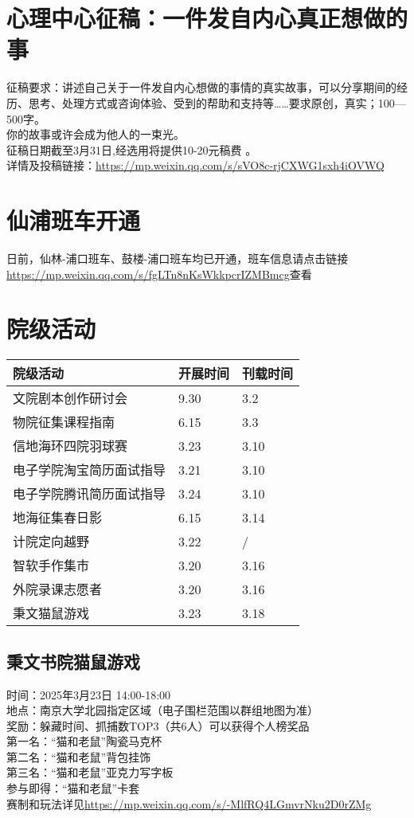\documentclass[letterpaper, 12pt]{article}
\begin{document}
\begin{multicols}{2}
\section{心理中心征稿：一件发自内心真正想做的事}
征稿要求：讲述自己关于一件发自内心想做的事情的真实故事，可以分享期间的经历、思考、处理方式或咨询体验、受到的帮助和支持等……要求原创，真实；100—500字。\\
你的故事或许会成为他人的一束光。\\
征稿日期截至3月31日,经选用将提供10-20元稿费 。\\
详情及投稿链接：\url{https://mp.weixin.qq.com/s/sVO8c-rjCXWG1sxh4iOVWQ}\\


\section{仙浦班车开通}
日前，仙林-浦口班车、鼓楼-浦口班车均已开通，班车信息请点击链接\url{https://mp.weixin.qq.com/s/fgLTn8nKsWkkpcrIZMBmcg}查看
\section{院级活动}
\begin{tabular}{|>{\centering\arraybackslash}m{}|m{}|m{}|}
    \hline
    院级活动 & 开展时间 & 刊载时间\\
    \hline\hline
    文院剧本创作研讨会 & 9.30 & 3.2\\
    物院征集课程指南 & 6.15 & 3.3\\
    信地海环四院羽球赛 & 3.23 & 3.10\\
    电子学院淘宝简历面试指导 & 3.21 & 3.10\\
    电子学院腾讯简历面试指导 & 3.24 & 3.10\\
    地海征集春日影 & 6.15 & 3.14\\
    计院定向越野 & 3.22 & / \\
    智软手作集市 & 3.20 & 3.16\\
    外院录课志愿者 & 3.20 & 3.16\\
    秉文猫鼠游戏 & 3.23 & 3.18\\
    \hline
\end{tabular}
\subsection{秉文书院猫鼠游戏}
时间：2025年3月23日 14:00-18:00\\
地点：南京大学北园指定区域（电子围栏范围以群组地图为准）\\
奖励：躲藏时间、抓捕数TOP3（共6人）可以获得个人榜奖品\\
第一名：“猫和老鼠”陶瓷马克杯\\
第二名：“猫和老鼠”背包挂饰\\
第三名：“猫和老鼠”亚克力写字板\\
参与即得：“猫和老鼠”卡套\\
赛制和玩法详见\url{https://mp.weixin.qq.com/s/-MlfRQ4LGmvrNku2D0rZMg}


\end{multicols}
\end{document}
